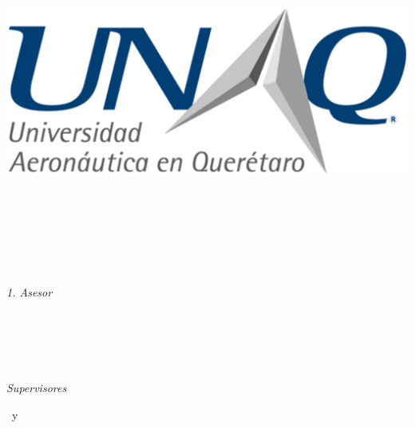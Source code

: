 \begin{titlepage}
	\tgherosfont
	\centering

	{\Large \thesisUniversity} \\[4mm]
	\includegraphics[scale=0.3]{Contenido/Titulo/UNAQ.eps}\\[2mm]
	\textsf{\thesisUniversityDepartment} \\
	\textsf{\thesisUniversityInstitute} \\
	\textsf{\thesisUniversityGroup} \\

	\vfill
	{\large \thesisSubject} \\[5mm]
	{\LARGE \color{ctcolortitle}\textbf{\thesisTitle} \\[10mm]}
	{\Large \thesisName} \\

	\vfill
	\begin{minipage}[t]{.27\textwidth}
		\raggedleft
		\textit{1. Asesor}
	\end{minipage}
	\hspace*{15pt}
	\begin{minipage}[t]{.65\textwidth}
		{\Large \thesisFirstReviewer} \\
	  	{\small \thesisFirstReviewerDepartment} \\[-1mm]
		{\small \thesisFirstReviewerUniversity}
	\end{minipage} \\[5mm]
	\begin{minipage}[t]{.27\textwidth}
		\raggedleft
		\textit{Supervisores}
	\end{minipage}
	\hspace*{15pt}
	\begin{minipage}[t]{.65\textwidth}
		\thesisFirstSupervisor\ y \thesisSecondSupervisor
	\end{minipage} \\[10mm]


\end{titlepage}
